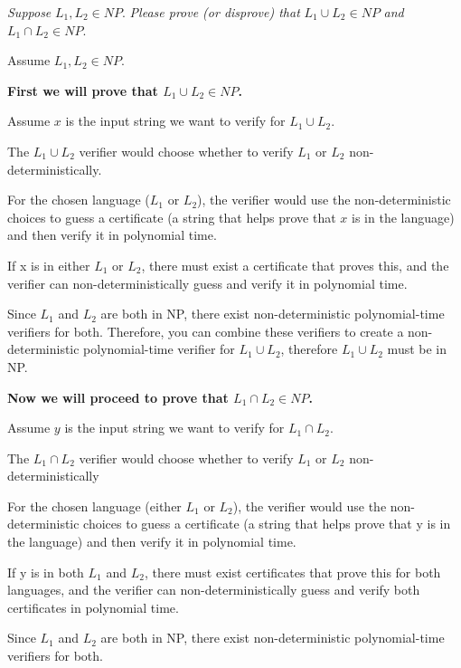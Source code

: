 \documentclass{cis320}
\begin{document}
\maketitle



\HWproblem
\textit{Suppose} \( L_1, L_2 \in NP \). \textit{Please prove (or disprove) that }\( L_1 \cup L_2 \in NP \) \textit{and} \(L_1 \cap L_2 \in NP\).

Assume \( L_1, L_2 \in NP \).

\textbf{First we will prove that \( L_1 \cup L_2 \in NP \).}

Assume \( x \) is the input string we want to verify for \( L_1 \cup L_2\).

The \( L_1 \cup L_2\) verifier would choose whether to verify \(L_1\) or \(L_2\) non-deterministically.

For the chosen language (\(L_1\) or \(L_2\)), the verifier would use the non-deterministic choices to guess a certificate (a string that helps prove that \( x \) is in the language) and then verify it in polynomial time.

If x is in either \(L_1\) or \(L_2\), there must exist a certificate that proves this, and the verifier can non-deterministically guess and verify it in polynomial time.

Since \(L_1\) and \(L_2\) are both in NP, there exist non-deterministic polynomial-time verifiers for both. Therefore, you can combine these verifiers to create a non-deterministic polynomial-time verifier for \( L_1 \cup L_2\), therefore \( L_1 \cup L_2\) must be in NP.

\textbf{Now we will proceed to prove that \(L_1 \cap L_2 \in NP\).}

Assume \( y \) is the input string we want to verify for \( L_1 \cap L_2\).

The \( L_1 \cap L_2\) verifier would choose whether to verify \(L_1\) or \(L_2\) non-deterministically

For the chosen language (either \(L_1\) or \(L_2\)), the verifier would use the non-deterministic choices to guess a certificate (a string that helps prove that y is in the language) and then verify it in polynomial time.

If y is in both \(L_1\) and \(L_2\), there must exist certificates that prove this for both languages, and the verifier can non-deterministically guess and verify both certificates in polynomial time.

Since \(L_1\) and \(L_2\) are both in NP, there exist non-deterministic polynomial-time verifiers for both. 
\end{document}
